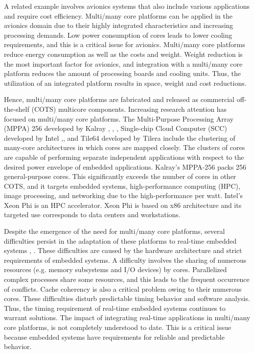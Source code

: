 \documentclass{sig-alternate-05-2015}
\begin{document}
A related example involves avionics systems that also include various applications and require cost efficiency.
Multi/many core platforms can be applied in the avionics domain due to their highly integrated characteristics and increasing processing demands.
Low power consumption of cores leads to lower cooling requirements, and this is a critical issue for avionics.
Multi/many core platforms reduce energy consumption as well as the costs and weight.
Weight reduction is the most important factor for avionics, and integration with a multi/many core platform reduces the amount of processing boards and cooling units.
Thus, the utilization of an integrated platform results in space, weight and cost reductions.

Hence, multi/many core platforms are fabricated and released as commercial off-the-shelf (COTS) multicore components.
Increasing research attention has focused on multi/many core platforms.
The Multi-Purpose Processing Array (MPPA) 256 developed by Kalray \cite{de2013distributed}, \cite{de2013clustered}, \cite{de2014time}, Single-chip Cloud Computer (SCC) developed by Intel \cite{intel2015scc},\cite{baron2010single}, and Tile64 developed by Tilera \cite{tilera2015tile64} include the clustering of many-core architectures in which cores are mapped closely.
The clusters of cores are capable of performing separate independent applications with respect to the desired power envelope of embedded applications.
Kalray's MPPA-256 packs 256 general-purpose cores.
This significantly exceeds the number of cores in other COTS, and it targets embedded systems, high-performance computing (HPC), image processing, and networking due to the high-performance per watt.
Intel's Xeon Phi \cite{chrysos2014intel} \cite{chrysos2012intel} is an HPC accelerator.
Xeon Phi is based on x86 architecture and its targeted use
corresponds to data centers and workstations.

Despite the emergence of the need for multi/many core platforms, several difficulties persist in the adaptation of these platforms to real-time embedded systems \cite{becker2016contention}, \cite{saidi2015shift}.
These difficulties are caused by the hardware architecture and strict requirements of embedded systems.
A difficulty involves the sharing of numerous resources (e.g. memory subsystems and I/O devices) by cores. Parallelized complex processes share some resources, and this leads to the frequent occurrence of conflicts.
Cache coherency is also a critical problem owing to their numerous cores.
These difficulties disturb predictable timing behavior and software analysis.
Thus, the timing requirement of real-time embedded systems continues to warrant solutions.
The impact of integrating real-time applications in multi/many core platforms, is not completely understood to date.
This is a critical issue because embedded systems have requirements for reliable and predictable behavior.
\end{document}
